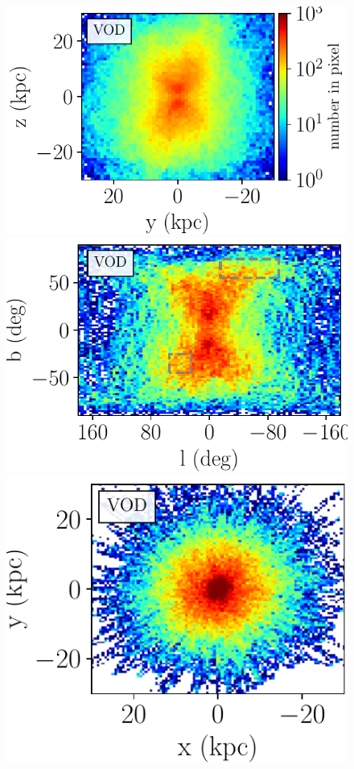\documentclass[fleqn,usenatbib]{mnras}
\begin{document}
\begin{figure}
             \includegraphics[scale=0.302]{VOD_orbits_8Gyrs_yz_defaultmass.pdf}\\ \includegraphics[scale=0.302]{VOD_orbits_8Gyrs_lb_sausage.pdf}
             \includegraphics[scale=0.302]{VOD_orbits_8Gyrs_xy_sausage.pdf}

\end{figure}
\end{document}
